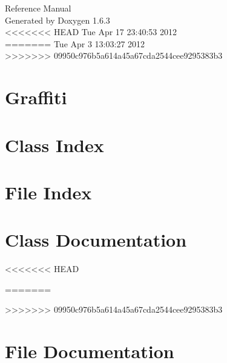 \documentclass[a4paper]{book}
\begin{document}
\hypersetup{pageanchor=false}
\begin{titlepage}
\vspace*{7cm}
\begin{center}
{\Large Reference Manual}\\
\vspace*{1cm}
{\large Generated by Doxygen 1.6.3}\\
\vspace*{0.5cm}
<<<<<<< HEAD
{\small Tue Apr 17 23:40:53 2012}\\
=======
{\small Tue Apr 3 13:03:27 2012}\\
>>>>>>> 09950c976b5a614a45a67cda2544cee9295383b3
\end{center}
\end{titlepage}
\clearemptydoublepage
{}
\tableofcontents
\clearemptydoublepage
{}
\hypersetup{pageanchor=true}
\chapter{Graffiti}
\label{index}\hypertarget{index}{}
\chapter{Class Index}

\chapter{File Index}

\chapter{Class Documentation}




<<<<<<< HEAD


=======

>>>>>>> 09950c976b5a614a45a67cda2544cee9295383b3






\chapter{File Documentation}

\printindex
\end{document}
